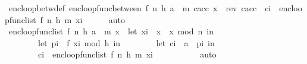 \begin{isabellebody}
\ enc{\isacharunderscore}{\kern0pt}loop{\isacharunderscore}{\kern0pt}betw{\isacharunderscore}{\kern0pt}def{\isacharcolon}{\kern0pt}\ {\isachardoublequoteopen}enc{\isacharunderscore}{\kern0pt}loop{\isacharunderscore}{\kern0pt}func{\isacharunderscore}{\kern0pt}between\ {\isacharparenleft}{\kern0pt}f{\isacharcomma}{\kern0pt}\ n{\isacharcomma}{\kern0pt}\ h{\isacharcomma}{\kern0pt}\ a\ {\isacharhash}{\kern0pt}\ m{\isacharparenright}{\kern0pt}\ c{\isacharunderscore}{\kern0pt}acc\ x\ {\isacharequal}{\kern0pt}\ rev\ c{\isacharunderscore}{\kern0pt}acc\ {\isacharat}{\kern0pt}\ {\isacharparenleft}{\kern0pt}{\isacharquery}{\kern0pt}c{\isacharunderscore}{\kern0pt}i\ {\isacharhash}{\kern0pt}\ enc{\isacharunderscore}{\kern0pt}loop{\isacharunderscore}{\kern0pt}func{\isacharunderscore}{\kern0pt}list\ {\isacharparenleft}{\kern0pt}f{\isacharcomma}{\kern0pt}\ n{\isacharcomma}{\kern0pt}\ h{\isacharcomma}{\kern0pt}\ m{\isacharparenright}{\kern0pt}\ {\isacharquery}{\kern0pt}x{\isacharunderscore}{\kern0pt}i{\isacharparenright}{\kern0pt}{\isachardoublequoteclose}\isanewline
\ \ \ \ \isamarkupfalse%
\ auto\isanewline
\ \ \isamarkupfalse%
\ {\isachardoublequoteopen}enc{\isacharunderscore}{\kern0pt}loop{\isacharunderscore}{\kern0pt}func{\isacharunderscore}{\kern0pt}list\ {\isacharparenleft}{\kern0pt}f{\isacharcomma}{\kern0pt}\ n{\isacharcomma}{\kern0pt}\ h{\isacharcomma}{\kern0pt}\ a\ {\isacharhash}{\kern0pt}\ m{\isacharparenright}{\kern0pt}\ x\ {\isacharequal}{\kern0pt}\ {\isacharparenleft}{\kern0pt}let\ x{\isacharunderscore}{\kern0pt}i\ {\isacharequal}{\kern0pt}\ x\ {\isacharasterisk}{\kern0pt}\ x\ mod\ n\ in\isanewline
\ \ \ \ \ \ \ \ let\ p{\isacharunderscore}{\kern0pt}i\ {\isacharequal}{\kern0pt}\ f\ {\isacharparenleft}{\kern0pt}x{\isacharunderscore}{\kern0pt}i\ mod\ {}{\isacharcircum}{\kern0pt}h{\isacharparenright}{\kern0pt}\ in\isanewline
\ \ \ \ \ \ \ \ let\ c{\isacharunderscore}{\kern0pt}i\ {\isacharequal}{\kern0pt}\ a\ {\isacharbrackleft}{\kern0pt}{\isasymoplus}{\isacharbrackright}{\kern0pt}\ p{\isacharunderscore}{\kern0pt}i\ in\isanewline
\ \ \ \ \ \ \ \ c{\isacharunderscore}{\kern0pt}i\ {\isacharhash}{\kern0pt}\ enc{\isacharunderscore}{\kern0pt}loop{\isacharunderscore}{\kern0pt}func{\isacharunderscore}{\kern0pt}list\ {\isacharparenleft}{\kern0pt}f{\isacharcomma}{\kern0pt}\ n{\isacharcomma}{\kern0pt}\ h{\isacharcomma}{\kern0pt}\ m{\isacharparenright}{\kern0pt}\ x{\isacharunderscore}{\kern0pt}i\isanewline
\ \ \ \ \ \ \ \ {\isacharparenright}{\kern0pt}{\isachardoublequoteclose}\ \isamarkupfalse%
\ auto\isanewline
\ \ \isamarkupfalse%

\end{isabellebody}
